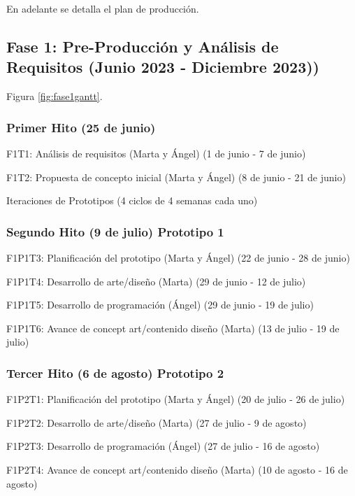 En adelante se detalla el plan de producción.

\subsection{Fase 1: Pre-Producción y Análisis de Requisitos (Junio 2023 - Diciembre 2023))}

Figura \ref{fig:fase1gantt}.

\subsubsection{Primer Hito (25 de junio)}
\begin{compactitem}
\item F1T1: Análisis de requisitos (Marta y Ángel) (1 de junio - 7 de junio)
\item F1T2: Propuesta de concepto inicial (Marta y Ángel) (8 de junio - 21 de junio)
\end{compactitem}
Iteraciones de Prototipos (4 ciclos de 4 semanas cada uno)

\subsubsection{Segundo Hito (9 de julio) Prototipo 1}

\begin{compactitem}
  \item F1P1T3: Planificación del prototipo (Marta y Ángel) (22 de junio - 28 de junio)
  \item F1P1T4: Desarrollo de arte/diseño (Marta) (29 de junio - 12 de julio)
  \item F1P1T5: Desarrollo de programación (Ángel) (29 de junio - 19 de julio)
  \item F1P1T6: Avance de concept art/contenido diseño (Marta) (13 de julio - 19 de julio)
\end{compactitem}

\subsubsection{Tercer Hito (6 de agosto) Prototipo 2}

\begin{compactitem}
  \item F1P2T1: Planificación del prototipo (Marta y Ángel) (20 de julio - 26 de julio)
  \item F1P2T2: Desarrollo de arte/diseño (Marta) (27 de julio - 9 de agosto)
  \item F1P2T3: Desarrollo de programación (Ángel) (27 de julio - 16 de agosto)
  \item F1P2T4: Avance de concept art/contenido diseño (Marta) (10 de agosto - 16 de agosto)
\end{compactitem}

